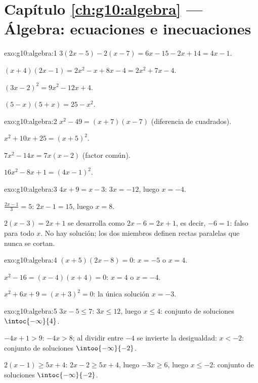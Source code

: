 \section*{Capítulo \ref{ch:g10:algebra} --- Álgebra: ecuaciones e inecuaciones}

\begin{solution}{exo:g10:algebra:1}
$3(2x-5) - 2(x-7) = 6x - 15 - 2x + 14 = 4x - 1$.

$(x+4)(2x-1) = 2x^2 - x + 8x - 4 = 2x^2 + 7x - 4$.

$(3x-2)^2 = 9x^2 - 12x + 4$.

$(5-x)(5+x) = 25 - x^2$.
\end{solution}

\begin{solution}{exo:g10:algebra:2}
$x^2 - 49 = (x+7)(x-7)$ (diferencia de cuadrados).

$x^2 + 10x + 25 = (x+5)^2$.

$7x^2 - 14x = 7x(x - 2)$ (factor común).

$16x^2 - 8x + 1 = (4x - 1)^2$.
\end{solution}

\begin{solution}{exo:g10:algebra:3}
$4x + 9 = x - 3$: $3x = -12$, luego $x = -4$.

$\frac{2x-1}{3} = 5$: $2x - 1 = 15$, luego $x = 8$.

$2(x-3) = 2x + 1$ se desarrolla como $2x - 6 = 2x + 1$, es decir,
$-6 = 1$: falso para todo $x$. No hay solución; los dos miembros definen
rectas paralelas que nunca se cortan.
\end{solution}

\begin{solution}{exo:g10:algebra:4}
$(x+5)(2x-8) = 0$: $x = -5$ o $x = 4$.

$x^2 - 16 = (x-4)(x+4) = 0$: $x = 4$ o $x = -4$.

$x^2 + 6x + 9 = (x+3)^2 = 0$: la única solución $x = -3$.
\end{solution}

\begin{solution}{exo:g10:algebra:5}
$3x - 5 \leq 7$: $3x \leq 12$, luego $x \leq 4$: conjunto de soluciones
$\intoc{-\infty}{4}$.

$-4x + 1 > 9$: $-4x > 8$; al dividir entre $-4$ se invierte la
desigualdad: $x < -2$: conjunto de soluciones $\intoo{-\infty}{-2}$.

$2(x-1) \geq 5x + 4$: $2x - 2 \geq 5x + 4$, luego $-3x \geq 6$, luego
$x \leq -2$: conjunto de soluciones $\intoc{-\infty}{-2}$.
\end{solution}

